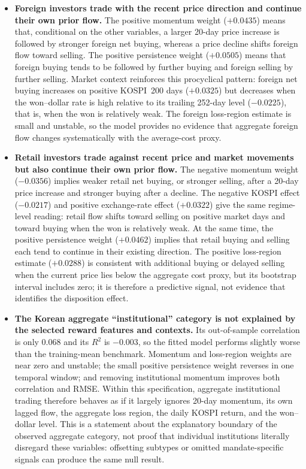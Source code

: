 \documentclass[sigconf,anonymous,review]{acmart}
\begin{document}
\begin{itemize}
\item \textbf{Foreign investors trade with the recent price direction and
continue their own prior flow.} The positive momentum weight ($+0.0435$) means
that, conditional on the other variables, a larger 20-day price increase is
followed by stronger foreign net buying, whereas a price decline shifts foreign
flow toward selling. The positive persistence weight ($+0.0505$) means that
foreign buying tends to be followed by further buying and foreign selling by
further selling. Market context reinforces this procyclical pattern: foreign net
buying increases on positive KOSPI~200 days ($+0.0325$) but decreases when the
won--dollar rate is high relative to its trailing 252-day level ($-0.0225$),
that is, when the won is relatively weak. The foreign loss-region estimate is
small and unstable, so the model provides no evidence that aggregate foreign
flow changes systematically with the average-cost proxy.

\item \textbf{Retail investors trade against recent price and market movements
but also continue their own prior flow.} The negative momentum weight
($-0.0356$) implies weaker retail net buying, or stronger selling, after a
20-day price increase and stronger buying after a decline. The negative KOSPI
effect ($-0.0217$) and positive exchange-rate effect ($+0.0322$) give the same
regime-level reading: retail flow shifts toward selling on positive market days
and toward buying when the won is relatively weak. At the same time, the
positive persistence weight ($+0.0462$) implies that retail buying and selling
each tend to continue in their existing direction. The positive loss-region
estimate ($+0.0288$) is consistent with additional buying or delayed selling
when the current price lies below the aggregate cost proxy, but its bootstrap
interval includes zero; it is therefore a predictive signal, not evidence that
identifies the disposition effect.

\item \textbf{The Korean aggregate ``institutional'' category is not explained
by the selected reward features and contexts.} Its out-of-sample correlation is
only 0.068 and its $R^2$ is $-0.003$, so the fitted model performs slightly
worse than the training-mean benchmark. Momentum and loss-region weights are
near zero and unstable; the small positive persistence weight reverses in one
temporal window; and removing institutional momentum improves both correlation
and RMSE. Within this specification, aggregate institutional trading therefore
behaves as if it largely ignores 20-day momentum, its own lagged flow, the
aggregate loss region, the daily KOSPI return, and the won--dollar level. This
is a statement about the explanatory boundary of the observed aggregate
category, not proof that individual institutions literally disregard these
variables: offsetting subtypes or omitted mandate-specific signals can produce
the same null result.
\end{itemize}
\end{document}
